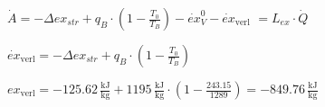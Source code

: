 \( \dot{A} = - \Delta ex_{str} + q_B \cdot \left( 1 - \frac{T_0}{T_B} \right) - \dot{ex}_V^0 - \dot{ex}_{\text{verl}} \)  
\( = L_{ex} \cdot \dot{Q} \)  

\( \dot{ex}_{\text{verl}} = - \Delta ex_{str} + q_B \cdot \left( 1 - \frac{T_0}{T_B} \right) \)  

\( ex_{\text{verl}} = -125.62 \, \frac{\text{kJ}}{\text{kg}} + 1195 \, \frac{\text{kJ}}{\text{kg}} \cdot \left( 1 - \frac{243.15}{1289} \right) = -849.76 \, \frac{\text{kJ}}{\text{kg}} \)